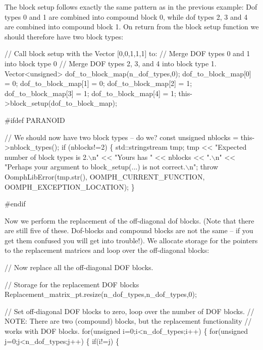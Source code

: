 The block setup follows exactly the same pattern as in the previous example\+: Dof types 0 and 1 are combined into compound block 0, while dof types 2, 3 and 4 are combined into compound block 1. On return from the block setup function we should therefore have two block types\+: 
\begin{DoxyCodeInclude}
  \textcolor{comment}{// Call block setup with the Vector [0,0,1,1,1] to:}
  \textcolor{comment}{// Merge DOF types 0 and 1 into block type 0}
  \textcolor{comment}{// Merge DOF types 2, 3, and 4 into block type 1.}
  Vector<unsigned> dof\_to\_block\_map(n\_dof\_types,0);
  dof\_to\_block\_map[0] = 0;
  dof\_to\_block\_map[1] = 0;
  dof\_to\_block\_map[2] = 1;
  dof\_to\_block\_map[3] = 1;
  dof\_to\_block\_map[4] = 1;
  this->block\_setup(dof\_to\_block\_map);

\textcolor{preprocessor}{#ifdef PARANOID}

  \textcolor{comment}{// We should now have two block types -- do we?}
  \textcolor{keyword}{const} \textcolor{keywordtype}{unsigned} nblocks = this->nblock\_types();
  \textcolor{keywordflow}{if} (nblocks!=2)
   \{
    std::stringstream tmp;
    tmp << \textcolor{stringliteral}{"Expected number of block types is 2.\(\backslash\)n"}
        << \textcolor{stringliteral}{"Yours has "} << nblocks << \textcolor{stringliteral}{".\(\backslash\)n"}
        << \textcolor{stringliteral}{"Perhaps your argument to block\_setup(...) is not correct.\(\backslash\)n"};
    \textcolor{keywordflow}{throw} OomphLibError(tmp.str(),
                        OOMPH\_CURRENT\_FUNCTION,
                        OOMPH\_EXCEPTION\_LOCATION);
   \}

\textcolor{preprocessor}{#endif}

\end{DoxyCodeInclude}


Now we perform the replacement of the off-\/diagonal dof blocks. (Note that there are still five of these. Dof-\/blocks and compound blocks are not the same -- if you get them confused you will get into trouble!). We allocate storage for the pointers to the replacement matrices and loop over the off-\/diagonal blocks\+:


\begin{DoxyCodeInclude}
  \textcolor{comment}{// Now replace all the off-diagonal DOF blocks.}

  \textcolor{comment}{// Storage for the replacement DOF blocks}
  Replacement\_matrix\_pt.resize(n\_dof\_types,n\_dof\_types,0);

  \textcolor{comment}{// Set off-diagonal DOF blocks to zero, loop over the number of DOF blocks.}
  \textcolor{comment}{// NOTE: There are two (compound) blocks, but the replacement functionality}
  \textcolor{comment}{// works with DOF blocks.}
  \textcolor{keywordflow}{for}(\textcolor{keywordtype}{unsigned} i=0;i<n\_dof\_types;i++)
   \{
    \textcolor{keywordflow}{for}(\textcolor{keywordtype}{unsigned} j=0;j<n\_dof\_types;j++)
     \{
      \textcolor{keywordflow}{if}(i!=j)
       \{

\end{DoxyCodeInclude}


